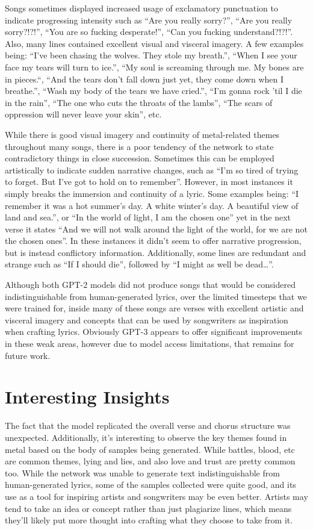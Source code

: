 \documentclass[11pt]{article}
\begin{document}
Songs sometimes displayed increased usage of exclamatory punctuation to indicate progressing intensity such as “Are you really sorry?”, “Are you really sorry?!?!”, “You are so fucking desperate!”, “Can you fucking understand?!?!”. Also, many lines contained excellent visual and visceral imagery. A few examples being: “I've been chasing the wolves. They stole my breath.”, “When I see your face my tears will turn to ice.”, “My soul is screaming through me. My bones are in pieces.“, “And the tears don't fall down just yet, they come down when I breathe.”, “Wash my body of the tears we have cried.”, “I'm gonna rock 'til I die in the rain”, “The one who cuts the throats of the lambs”, “The scars of oppression will never leave your skin”, etc.

While there is good visual imagery and continuity of metal-related themes throughout many songs, there is a poor tendency of the network to state contradictory things in close succession. Sometimes this can be employed artistically to indicate sudden narrative changes, such as “I'm so tired of trying to forget. But I've got to hold on to remember”. However, in most instances it simply breaks the immersion and continuity of a lyric. Some examples being: “I remember it was a hot summer's day. A white winter's day. A beautiful view of land and sea.”, or “In the world of light, I am the chosen one” yet in the next verse it states “And we will not walk around the light of the world, for we are not the chosen ones”. In these instances it didn’t seem to offer narrative progression, but is instead conflictory information. Additionally, some lines are redundant and strange such as “If I should die”, followed by “I might as well be dead…”.

Although both GPT-2 models did not produce songs that would be considered indistinguishable from human-generated lyrics, over the limited timesteps that we were trained for, inside many of these songs are verses with excellent artistic and visceral imagery and concepts that can be used by songwriters as inspiration when crafting lyrics. Obviously GPT-3 appears to offer significant improvements in these weak areas, however due to model access limitations, that remains for future work.


\section{Interesting Insights}

The fact that the model replicated the overall verse and chorus structure was unexpected. Additionally, it’s interesting to observe the key themes found in metal based on the body of samples being generated. While battles, blood, etc are common themes, lying and lies, and also love and trust are pretty common too. While the network was unable to generate text indistinguishable from human-generated lyrics, some of the samples collected were quite good, and its use as a tool for inspiring artists and songwriters may be even better. Artists may tend to take an idea or concept rather than just plagiarize lines, which means they’ll likely put more thought into crafting what they choose to take from it.
\end{document}
